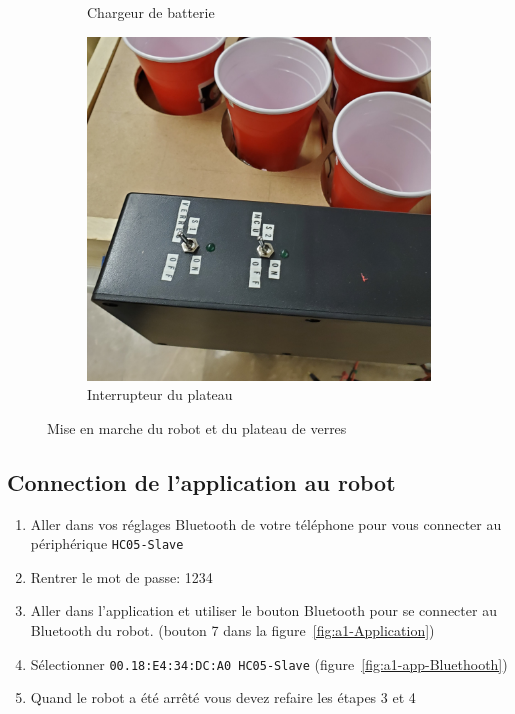 \begin{figure}[h!]
\begin{subfigure}{0.3\linewidth}
        \caption{Chargeur de batterie}
        \label{fig:a1-chargeur-batterie}
    \end{subfigure}
    \begin{subfigure}{0.3\linewidth}
        \centering
        \includegraphics[width=\linewidth]{img/a1/interrupteur-verres}
        \caption{Interrupteur du plateau}
        \label{fig:a1-interrupteur-verres}
    \end{subfigure}

    \caption{Mise en marche du robot et du plateau de verres}
    \label{fig:a1-demarrage-robot}
\end{figure}

\subsection{Connection de l'application au robot}

\begin{enumerate}
    \item Aller dans vos réglages Bluetooth de votre téléphone pour vous connecter au périphérique \texttt{HC05-Slave}
    \item Rentrer le mot de passe: 1234
    \item Aller dans l’application et utiliser le bouton Bluetooth pour se connecter au Bluetooth du robot. (bouton 7 dans la figure~\ref{fig:a1-Application})
    \item Sélectionner \texttt{00.18:E4:34:DC:A0 HC05-Slave} (figure~\ref{fig:a1-app-Bluethooth})
    \item Quand le robot a été arrêté vous devez refaire les étapes 3 et 4
\end{enumerate}

